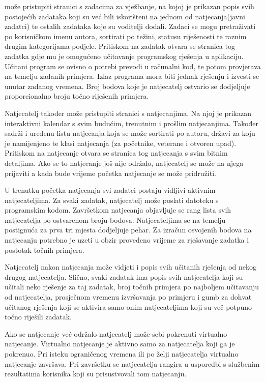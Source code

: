 		\eject
		
		\textit{} može pristupiti stranici s zadacima za vježbanje, na kojoj je prikazan popis svih postojećih zadataka koji su već bili iskorišteni na jednom od natjecanja(javni zadatci) te ostalih zadataka koje su voditelji dodali. Zadaci se mogu pretraživati po korisničkom imenu autora, sortirati po težini, statusu riješenosti  te raznim drugim kategorijama podjele. Pritiskom na zadatak otvara se stranica tog zadatka gdje mu je omogućeno učitavanje programskog rješenja u aplikaciju. Učitani program se ovisno o potrebi prevodi u računalni kod, te potom provjerava na temelju zadanih primjera. Izlaz programa mora biti jednak rješenju i izvesti se unutar zadanog vremena. Broj bodova koje je natjecatelj ostvario se dodjeljuje proporcionalno broju točno riješenih primjera.
		
		Natjecatelj također može pristupiti stranici s natjecanjima. Na njoj je prikazan interaktivni kalendar s svim budućim, trenutnim i prošlim natjecanjima. Također sadrži i uređenu listu natjecanja koja se može sortirati po autoru, državi za koju je namijenjeno te klasi natjecanja (za početnike, veterane i otvoren upad). Pritiskom na natjecanje otvara se stranica tog natjecanja s svim bitnim detaljima. Ako se to natjecanje još nije održalo, natjecatelj se može na njega prijaviti a kada bude vrijeme početka natjecanje se može pridružiti. 
		
		U trenutku početka natjecanja svi zadatci postaju vidljivi aktivnim natjecateljima. Za svaki zadatak, natjecatelj može poslati datoteku s programskim kodom. Završetkom natjecanja objavljuje se rang lista svih natjecatelja po ostvarenom broju bodova. Natjecateljima se na temelju postignuća za prva tri mjesta dodjeljuje pehar. Za izračun osvojenih bodova na natjecanju potrebno je uzeti u obzir provedeno vrijeme za rješavanje zadatka i postotak točnih primjera. 
		
		Natjecatelj nakon natjecanja može vidjeti i popis svih učitanih rješenja od nekog drugog natjecatelja. Slično, svaki zadatak ima popis svih natjecatelja koji su učitali neko rješenje za taj zadatak, broj točnih primjera po najboljem učitavanju od natjecatelja, prosječnom vremenu izvršavanja po primjeru i gumb za dohvat učitanog rješenja koji se aktivira samo onim natjecateljima koji su več potpuno točno riješili zadatak. 
		
		
		Ako se natjecanje već održalo natjecatelj može sebi pokrenuti virtualno natjecanje. Virtualno natjecanje je aktivno samo za natjecatelja koji ga je pokrenuo. Pri isteku ograničenog vremena ili po želji natjecatelja virtualno natjecanje završava. Pri završetku se natjecatelja rangira u usporedbi s službenim rezultatima korisnika koji su prisustvovali tom natjecanju.
		

